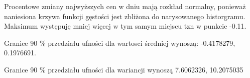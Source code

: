 \documentclass[
]{article}
\newenvironment{Shaded}{\begin{snugshade}}{\end{snugshade}}
\newcommand{\DecValTok}[1]{\textcolor[rgb]{0.00,0.00,0.81}{#1}}
\newcommand{\FloatTok}[1]{\textcolor[rgb]{0.00,0.00,0.81}{#1}}
\newcommand{\FunctionTok}[1]{\textcolor[rgb]{0.00,0.00,0.00}{#1}}
\newcommand{\NormalTok}[1]{#1}
\newcommand{\OtherTok}[1]{\textcolor[rgb]{0.56,0.35,0.01}{#1}}
\newcommand{\SpecialCharTok}[1]{\textcolor[rgb]{0.00,0.00,0.00}{#1}}
\begin{document}
Procentowe zmiany najwyższych cen w dniu mają rozkład normalny, ponieważ
naniesiona krzywa funkcji gęstości jest zbliżona do narysowanego
historgramu. Maksimum występuję mniej więcej w tym samym miejscu tzn w
punkcie -0.11.

\begin{Shaded}
\end{Shaded}

Granice 90 \% przedziału ufności dla wartosci średniej wynoszą:
-0.4178279, 0.1976691.

Granice 90 \% przedziału ufności dla wariancji wynoszą 7.6062326,
10.2075035
\end{document}
